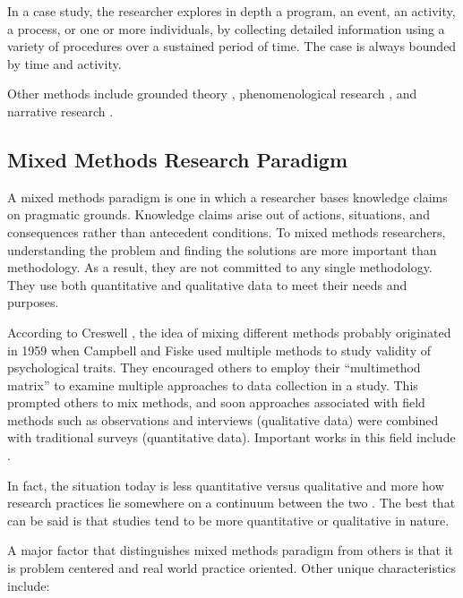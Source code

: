 In a case study, the researcher explores in depth a program, an event, an activity, a process, or one or more individuals, by collecting detailed information using a variety of procedures over a sustained period of time. The case is always bounded by time and activity.

Other methods include grounded theory \cite{Strauss:1998}, phenomenological research \cite{Moustakas:1994}, and narrative research \cite{Clandinin:2000}.




\subsection{Mixed Methods Research Paradigm}

A mixed methods paradigm is one in which a researcher bases knowledge claims on pragmatic grounds. Knowledge claims arise out of actions, situations, and consequences rather than antecedent conditions. To mixed methods researchers, understanding the problem and finding the solutions are more important than methodology. As a result, they are not committed to any single methodology. They use both quantitative and qualitative data to meet their needs and purposes. 

According to Creswell \cite{Creswell:2003}, the idea of mixing different methods probably originated in 1959 when Campbell and Fiske used multiple methods to study validity of psychological traits. They encouraged others to employ their ``multimethod matrix'' to examine multiple approaches to data collection in a study. This prompted others to mix methods, and soon approaches associated with field methods such as observations and interviews (qualitative data) were combined with traditional surveys (quantitative data). Important works in this field include \cite{Rorty:1990, Murphy:1990, Patton:1990, Cherryholmes:1992, Tashakkori:1998}.

In fact, the situation today is less quantitative versus qualitative and more how research practices lie somewhere on a continuum between the two \cite{Neuman:1998}. The best that can be said is that studies tend to be more quantitative or qualitative in nature.

A major factor that distinguishes mixed methods paradigm from others is that it is problem centered and real world practice oriented. Other unique characteristics include:

